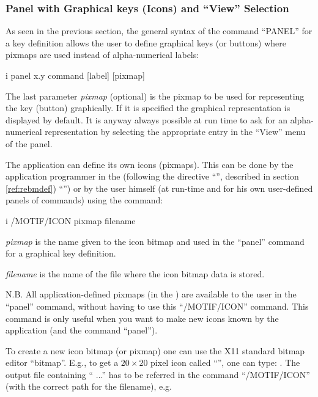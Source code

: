 \subsubsection{Panel with Graphical keys (Icons) and ``View'' Selection}
\label{ref:repaview}
 
As seen in the previous section,
the general syntax of the \KUIPMotif{} command ``PANEL''
for a key definition allows the user to define
graphical keys (or buttons) where pixmaps are used instead of
alpha-numerical labels:
 
\begin{Gray}{i}
 panel x.y command [label] [pixmap]
\end{Gray}
 
The last parameter {\it pixmap} (optional) is the pixmap to be used for
representing the key (button) graphically. If it is specified the
graphical representation is displayed by default. It is anyway
always possible at run time to ask for an alpha-numerical
representation by selecting the appropriate entry in the ``View''
menu of the panel.
 
The application can define its own icons (pixmaps). This can
be done by the application programmer in the \CDF{}
(following the \KUIPMotif{} directive
\ifKUIPman
  ``'', described in section \ref{ref:rebmdef})
\else
  ``'')
\fi
or by the user himself (at run-time and for his own user-defined panels
of commands) using the \KUIPMotif{} command:
\begin{Gray}{i}
 /MOTIF/ICON pixmap filename
\end{Gray}
\begin{UL}
\item {\it pixmap} is the name given to the icon bitmap and
used in the ``panel'' command for a graphical key definition.
\item {\it filename} is the name of the file where the icon bitmap
data is stored.
\end{UL}
N.B. All application-defined pixmaps (in the \CDF{}) are available to the
user in the ``panel'' command, without having to use this ``/MOTIF/ICON''
command. This command is only useful when you want to make new icons
known by the application (and the command ``panel'').
 
To create a new icon bitmap (or pixmap) one can use the X11 standard bitmap
editor ``bitmap''. E.g., to get a $20\times20$ pixel icon called
``'', one can type: .
The output file  containing `` ...''
has to be referred in the command ``/MOTIF/ICON'' (with the correct
path for the filename), e.g.\ 
 
